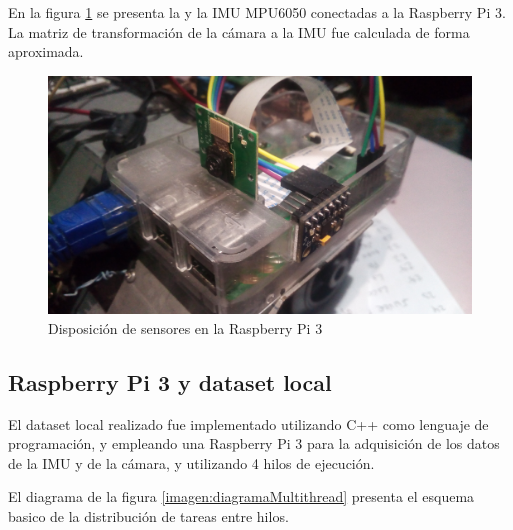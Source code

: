 En la figura \ref{imagen:Raspbery} se presenta la   y la IMU MPU6050 conectadas a la Raspberry Pi 3.  La matriz de transformación de la cámara a la IMU fue calculada de forma aproximada.



\begin{figure}[H]
	\centering		\includegraphics[width=0.7\linewidth]{imagenes/prototipo/Raspberry}
	\caption{Disposición de sensores en la Raspberry Pi 3}
	\label{imagen:Raspbery}
\end{figure}


\subsection{Raspberry Pi 3 y dataset local}

El dataset local realizado fue implementado utilizando C++ como lenguaje de programación, y empleando una Raspberry Pi 3 para la adquisición de los datos de la IMU y de la cámara, y utilizando 4 hilos de ejecución.

El diagrama de la figura \ref{imagen:diagramaMultithread} presenta el esquema basico de la distribución de tareas entre hilos.

